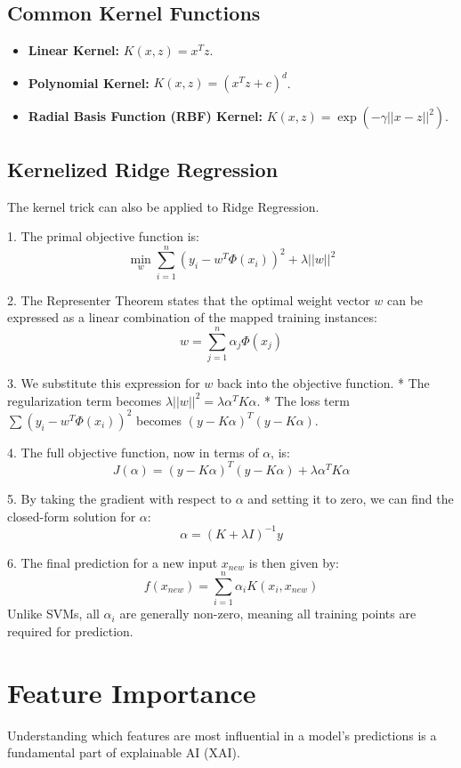 \documentclass{article}
\begin{document}
\begin{multicols}{2}
\subsection{Common Kernel Functions}
\begin{itemize}
    \item \textbf{Linear Kernel:} $K(x, z) = x^T z$.
    \item \textbf{Polynomial Kernel:} $K(x, z) = (x^T z + c)^d$.
    \item \textbf{Radial Basis Function (RBF) Kernel:} $K(x, z) = \exp(-\gamma ||x - z||^2)$.
\end{itemize}

\subsection{Kernelized Ridge Regression}
The kernel trick can also be applied to Ridge Regression.

1.  The primal objective function is:
    $$\min_{w} \sum_{i=1}^{n} (y_i - w^T \Phi(x_i))^2 + \lambda ||w||^2$$
   
2.  The Representer Theorem states that the optimal weight vector $w$ can be expressed as a linear combination of the mapped training instances:
    $$w = \sum_{j=1}^{n} \alpha_j \Phi(x_j)$$

3.  We substitute this expression for $w$ back into the objective function.
    * The regularization term becomes $\lambda ||w||^2 = \lambda \alpha^T K \alpha$.
    * The loss term $\sum(y_i - w^T\Phi(x_i))^2$ becomes $(y - K\alpha)^T (y - K\alpha)$.

4.  The full objective function, now in terms of $\alpha$, is:
    $$J(\alpha) = (y - K\alpha)^T (y - K\alpha) + \lambda \alpha^T K \alpha$$
   
5.  By taking the gradient with respect to $\alpha$ and setting it to zero, we can find the closed-form solution for $\alpha$:
    $$\alpha = (K+\lambda I)^{-1}y$$
   
6.  The final prediction for a new input $x_{new}$ is then given by:
    $$f(x_{new}) = \sum_{i=1}^n \alpha_i K(x_i, x_{new})$$
    Unlike SVMs, all $\alpha_i$ are generally non-zero, meaning all training points are required for prediction.

\section{Feature Importance}
Understanding which features are most influential in a model's predictions is a fundamental part of explainable AI (XAI).


\end{multicols}
\end{document}
